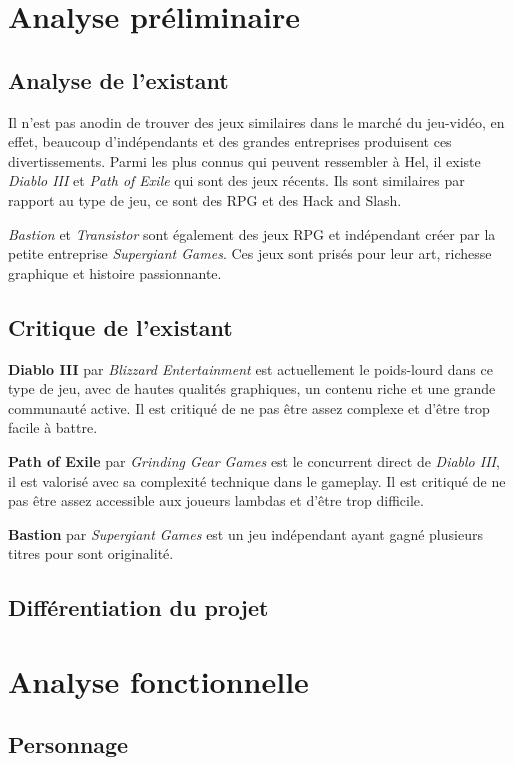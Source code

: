 \documentclass[11pt, a4paper, oneside]{report}
\newcommand{\projectTitle}{Hel}
\begin{document}
\chapter{Analyse préliminaire}
\section{Analyse de l'existant}
Il n'est pas anodin de trouver des jeux similaires dans le marché du jeu-vidéo, en effet, beaucoup d'indépendants et des grandes entreprises produisent ces divertissements. Parmi les plus connus qui peuvent ressembler à \projectTitle, il existe \emph{Diablo III} et \emph{Path of Exile} qui sont des jeux récents. Ils sont similaires par rapport au type de jeu, ce sont des RPG et des Hack and Slash.

\emph{Bastion} et \emph{Transistor} sont également des jeux RPG et indépendant créer par la petite entreprise \emph{Supergiant Games}. Ces jeux sont prisés pour leur art, richesse graphique et histoire passionnante.
\section{Critique de l'existant}
\textbf{Diablo III} par \emph{Blizzard Entertainment} est actuellement le poids-lourd dans ce type de jeu, avec de hautes qualités graphiques, un contenu riche et une grande communauté active. Il est critiqué de ne pas être assez complexe et d'être trop facile à battre. 

\textbf{Path of Exile} par \emph{Grinding Gear Games} est le concurrent direct de \emph{Diablo III}, il est valorisé avec sa complexité technique dans le gameplay. Il est critiqué de ne pas être assez accessible aux joueurs lambdas et d'être trop difficile.

\textbf{Bastion} par \emph{Supergiant Games} est un jeu indépendant ayant gagné plusieurs titres pour sont originalité.
\section{Différentiation du projet}

\newpage
\chapter{Analyse fonctionnelle}
\section{Personnage}
\end{document}
